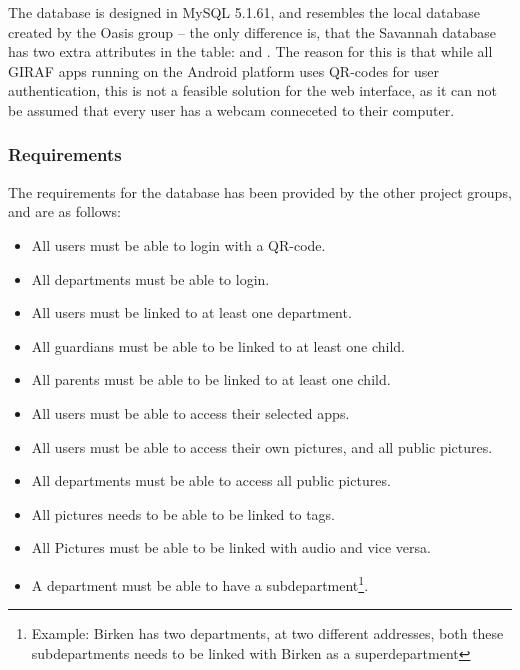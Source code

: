 The database is designed in MySQL 5.1.61, and resembles the local database created by the Oasis group -- the only difference is, that the Savannah database has two extra attributes in the  table:  and . The reason for this is that while all GIRAF apps running on the Android platform uses QR-codes for user authentication, this is not a feasible solution for the web interface, as it can not be assumed that every user has a webcam conneceted to their computer.

\subsubsection{Requirements}
\label{subsec:databaseReq}
The requirements for the database has been provided by the other project groups, and are as follows:

\begin{itemize} %
	\item All users must be able to login with a QR-code.
	\item All departments must be able to login.
	\item All users must be linked to at least one department.
	\item All guardians must be able to be linked to at least one child.
	\item All parents must be able to be linked to at least one child.
	\item All users must be able to access their selected apps.
	\item All users must be able to access their own pictures, and all public pictures.
	\item All departments must be able to access all public pictures.
	\item All pictures needs to be able to be linked to tags.
	\item All Pictures must be able to be linked with audio and vice versa.
	\item A department must be able to have a subdepartment\footnote{Example: Birken has two departments, at two different addresses, both these subdepartments needs to be linked with Birken as a superdepartment}.
\end{itemize}

